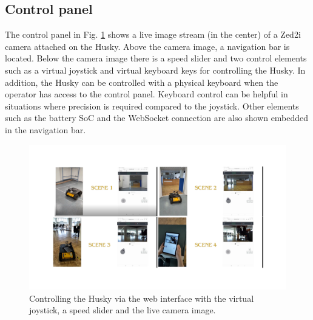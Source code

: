 \documentclass[letterpaper, 10 pt, conference]{ieeeconf}  %
\begin{document}
\subsection{Control panel}
The control panel in Fig. \ref{fig:clip} shows a live image stream (in the center) of a Zed2i camera attached on the Husky. Above the camera image, a navigation bar is located. 
Below the camera image there is a speed slider and two control elements such as a virtual joystick and virtual keyboard keys for controlling the Husky. 
In addition, the Husky can be controlled with a physical keyboard when the operator has access to the control panel. Keyboard control can be helpful in situations where precision is required compared to the joystick.
Other elements such as the battery SoC and the WebSocket connection are also shown embedded in the navigation bar.

\begin{figure}[t]
    \centerline{\includegraphics[width=\columnwidth]{images/clip.pdf}}
    \caption{Controlling the Husky via the web interface with the virtual joystick, a speed slider and the live camera image.}
    \label{fig:clip}
\end{figure}

\end{document}
